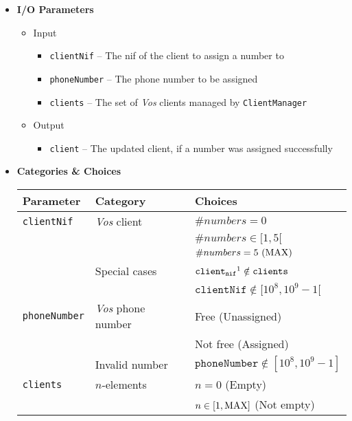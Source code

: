 \begin{itemize}
  \item \textbf{I/O Parameters}
  \begin{itemize}
    \normalsize
    \item Input
    \begin{itemize}
      \small
      \item \texttt{clientNif} -- The nif of the client to assign a number to
      \item \texttt{phoneNumber} -- The phone number to be assigned
      \item \texttt{clients} -- The set of \textit{Vos} clients managed by
            \texttt{ClientManager}
    \end{itemize}
    \item Output
    \begin{itemize}
      \item \texttt{client} -- The updated client, if a number was assigned
            successfully
    \end{itemize}
  \end{itemize}
  \clearpage

  \item \textbf{Categories \& Choices}
  \begin{table}[!hbtp]
    \centering
    \normalsize
    \begin{tabular}{|l|l|l|}
      \hline
      \textbf{Parameter} & \textbf{Category} & \textbf{Choices} \\ \hline
      \texttt{clientNif}
      & \textit{Vos} client
        & $\#numbers = 0$           \\ \cline{3-3}
      & & $\#numbers \in [1,5[$     \\ \cline{3-3}
      & & $\#numbers = 5\ (\rm{MAX})$ \\ \cline{2-3}
      & Special cases
        & $\texttt{client}_{\texttt{nif}}\footnotemark
           \notin \texttt{clients}$ \\ \cline{3-3}
      & & $\texttt{clientNif} \notin [10^8,10^9-1[$ \\ \hline
      \texttt{phoneNumber}
      & \textit{Vos} phone number
        & Free (Unassigned)   \\ \cline{3-3}
      & & Not free (Assigned) \\ \cline{2-3}
      & Invalid number
        & $\texttt{phoneNumber} \notin [10^8,10^9-1]$ \\ \hline
      \texttt{clients}
      & $n$-elements
        & $n = 0$ (Empty)                  \\ \cline{3-3}
      & & $n \in [1,\rm{MAX}]$ (Not empty) \\ \hline
    \end{tabular}
  \end{table}


\end{itemize}
